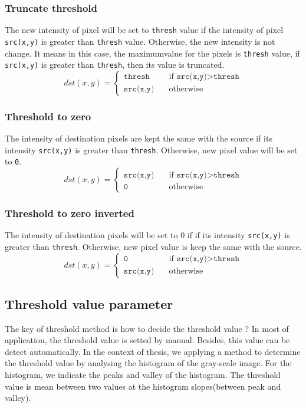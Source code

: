 \subsubsection{Truncate threshold}
The new intensity of pixel will be set to \texttt{thresh} value if the intensity of pixel \texttt{src(x,y)} is greater than \texttt{thresh} value. Otherwise, the new intensity is not change. It means in this case, the maximumvalue for the pixels is \texttt{thresh} value, if \texttt{src(x,y)} is greater than \texttt{thresh}, then its value is truncated.
\begin{equation}	
		dst(x,y) = 
		\begin{cases}
			\texttt{thresh} & \quad \text{if }\texttt{src(x,y)} > \texttt{thresh} \\
			\texttt{src(x,y)} & \quad \text{otherwise}
		\end{cases}	
\end{equation}
\subsubsection{Threshold to zero}
The intensity of destination pixels are kept the same with the source if its intensity \texttt{src(x,y)} is greater than \texttt{thresh}. Otherwise, new pixel value will be set to \texttt{0}.
\begin{equation}	
		dst(x,y) = 
		\begin{cases}
			\texttt{src(x,y)} & \quad \text{if }\texttt{src(x,y)} > \texttt{thresh} \\
			\texttt{0} & \quad \text{otherwise}
		\end{cases}	
\end{equation}
\subsubsection{Threshold to zero inverted}
The intensity of destination pixels will be set to 0 if if its intensity \texttt{src(x,y)} is greater than \texttt{thresh}. Otherwise, new pixel value is keep the same with the source.
\begin{equation}	
		dst(x,y) = 
		\begin{cases}
			\texttt{0} & \quad \text{if }\texttt{src(x,y)} > \texttt{thresh} \\
			\texttt{src(x,y)} & \quad \text{otherwise}
		\end{cases}	
\end{equation}
\subsection{Threshold value parameter}
The key of threshold method is how to decide the threshold value ? In most of application, the threshold value is setted by manual. Besides, this value can be detect automatically. In the context of thesis, we applying a method to determine the threshold value by analysing the histogram of the gray-scale image. For the histogram, we indicate the peaks and valley of the histogram. The threshold value is mean between two values at the histogram slopes(between peak and valley).
